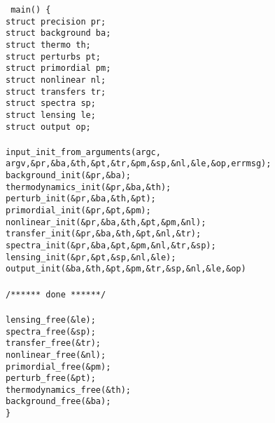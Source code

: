 \documentclass{article}
\begin{document}
\noindent
{\tt
main() \{ \\
\indent  struct precision pr;\\
\indent  struct background ba;\\
\indent  struct thermo th;     \\
\indent  struct perturbs pt;   \\
\indent  struct primordial pm;    \\
\indent  struct nonlinear nl;\\
\indent  struct transfers tr;  \\
\indent  struct spectra sp;     \\
\indent struct lensing le;\\
\indent  struct output op;      \\
 \\
\indent  input\_init\_from\_arguments(argc, argv,\&pr,\&ba,\&th,\&pt,\&tr,\&pm,\&sp,\&nl,\&le,\&op,errmsg);\\
\indent  background\_init(\&pr,\&ba);\\
\indent  thermodynamics\_init(\&pr,\&ba,\&th);\\
\indent  perturb\_init(\&pr,\&ba,\&th,\&pt);\\
\indent  primordial\_init(\&pr,\&pt,\&pm);\\
\indent  nonlinear\_init(\&pr,\&ba,\&th,\&pt,\&pm,\&nl);\\
\indent  transfer\_init(\&pr,\&ba,\&th,\&pt,\&nl,\&tr);\\
\indent  spectra\_init(\&pr,\&ba,\&pt,\&pm,\&nl,\&tr,\&sp);\\
\indent  lensing\_init(\&pr,\&pt,\&sp,\&nl,\&le);\\
\indent  output\_init(\&ba,\&th,\&pt,\&pm,\&tr,\&sp,\&nl,\&le,\&op)\\
\\
\indent  /****** done ******/\\
\\
\indent lensing\_free(\&le);\\
\indent spectra\_free(\&sp);\\
\indent transfer\_free(\&tr);\\
\indent nonlinear\_free(\&nl);\\
\indent primordial\_free(\&pm);\\
\indent perturb\_free(\&pt);\\
\indent thermodynamics\_free(\&th);\\
\indent background\_free(\&ba);\\
\}
}
\end{document}

